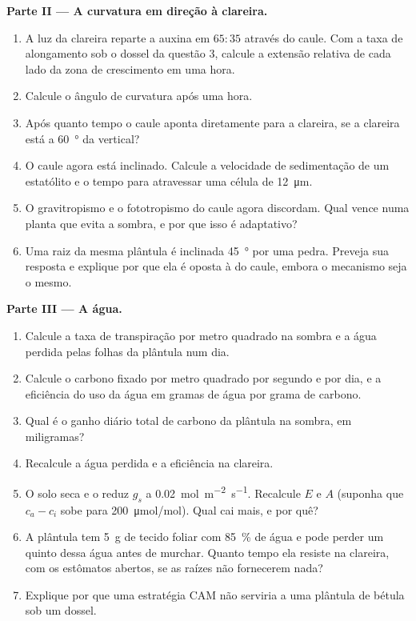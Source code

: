 \begin{problem}
\medskip
\noindent\textbf{Parte II --- A curvatura em direção à clareira.}
\begin{enumerate}[resume]
  \item A luz da clareira reparte a auxina em $65 : 35$ através do
        caule. Com a taxa de alongamento sob o dossel da questão 3,
        calcule a extensão relativa de cada lado da zona de crescimento
        em uma hora.
  \item Calcule o ângulo de curvatura após uma hora.
  \item Após quanto tempo o caule aponta diretamente para a clareira, se
        a clareira está a \qty{60}{\degree} da vertical?
  \item O caule agora está inclinado. Calcule a velocidade de
        sedimentação de um estatólito e o tempo para atravessar uma
        célula de \qty{12}{\micro m}.
  \item O gravitropismo e o fototropismo do caule agora discordam. Qual
        vence numa planta que evita a sombra, e por que isso é
        adaptativo?
  \item Uma raiz da mesma plântula é inclinada \qty{45}{\degree} por uma
        pedra. Preveja sua resposta e explique por que ela é oposta à do
        caule, embora o mecanismo seja o mesmo.
\end{enumerate}

\medskip
\noindent\textbf{Parte III --- A água.}
\begin{enumerate}[resume]
  \item Calcule a taxa de transpiração por metro quadrado na sombra e a
        água perdida pelas folhas da plântula num dia.
  \item Calcule o carbono fixado por metro quadrado por segundo e por
        dia, e a eficiência do uso da água em gramas de água por grama de
        carbono.
  \item Qual é o ganho diário total de carbono da plântula na sombra, em
        miligramas?
  \item Recalcule a água perdida e a eficiência na clareira.
  \item O solo seca e o  reduz $g_s$ a
        \qty{0.02}{mol.m^{-2}.s^{-1}}. Recalcule $E$ e $A$ (suponha que
        $c_a - c_i$ sobe para \qty{200}{\micro mol/mol}). Qual cai mais,
        e por quê?
  \item A plântula tem \qty{5}{g} de tecido foliar com \qty{85}{\%} de
        água e pode perder um quinto dessa água antes de murchar. Quanto
        tempo ela resiste na clareira, com os estômatos abertos, se as
        raízes não fornecerem nada?
  \item Explique por que uma estratégia CAM não serviria a uma plântula
        de bétula sob um dossel.
\end{enumerate}


\end{problem}
